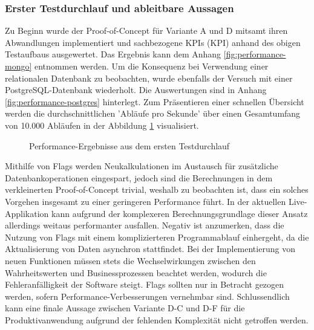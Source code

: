 \pagebreak

\subsubsection{Erster Testdurchlauf und ableitbare Aussagen}

Zu Beginn wurde der Proof-of-Concept für Variante A und D mitsamt ihren Abwandlungen implementiert und sachbezogene \acrshort{KPI}s (\acrlong{KPI}) anhand des obigen Testaufbaus ausgewertet. Das Ergebnis kann dem Anhang \ref{fig:performance-mongo} entnommen werden. Um die Konsequenz bei Verwendung einer relationalen Datenbank zu beobachten, wurde ebenfalls der Versuch mit einer PostgreSQL-Datenbank wiederholt. Die Auswertungen sind in Anhang \ref{fig:performance-postgres} hinterlegt. Zum Präsentieren einer schnellen Übersicht werden die durchschnittlichen 'Abläufe pro Sekunde' über einen Gesamtumfang von 10.000 Abläufen in der Abbildung \ref{fig:PerformanceDefault} visualisiert.

\begin{figure}[htpb]
	\centering
	\footnotesize
	
	\caption{Performance-Ergebnisse aus dem ersten Testdurchlauf}
	\label{fig:PerformanceDefault}
\end{figure}

Mithilfe von Flags werden Neukalkulationen im Austausch für zusätzliche Datenbankoperationen eingespart, jedoch sind die Berechnungen in dem verkleinerten Proof-of-Concept trivial, weshalb zu beobachten ist, dass ein solches Vorgehen insgesamt zu einer geringeren Performance führt. In der aktuellen Live-Applikation kann aufgrund der komplexeren Berechnungsgrundlage dieser Ansatz allerdings weitaus performanter ausfallen. Negativ ist anzumerken, dass die Nutzung von Flags mit einem komplizierteren Programmablauf einhergeht, da die Aktualisierung von Daten asynchron stattfindet. Bei der Implementierung von neuen Funktionen müssen stets die Wechselwirkungen zwischen den Wahrheitswerten und Businessprozessen beachtet werden, wodurch die Fehleranfälligkeit der Software steigt. Flags sollten nur in Betracht gezogen werden, sofern Performance-Verbesserungen vernehmbar sind. Schlussendlich kann eine finale Aussage zwischen Variante D-C und D-F für die Produktivanwendung aufgrund der fehlenden Komplexität nicht getroffen werden.

